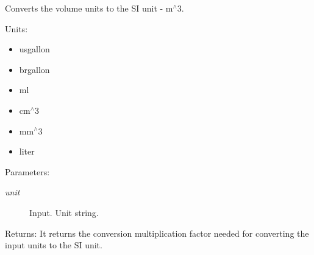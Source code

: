 Converts the volume units to the SI unit - m$^\wedge$3. 

Units:\begin{itemize}
\item usgallon\item brgallon\item ml\item cm$^\wedge$3\item mm$^\wedge$3\item liter\end{itemize}


\begin{Desc}
\item[Parameters:]
\begin{description}
\item[{\em unit}]Input. Unit string.\end{description}
\end{Desc}
\begin{Desc}
\item[Returns:]It returns the conversion multiplication factor needed for converting the input units to the SI unit. \end{Desc}
